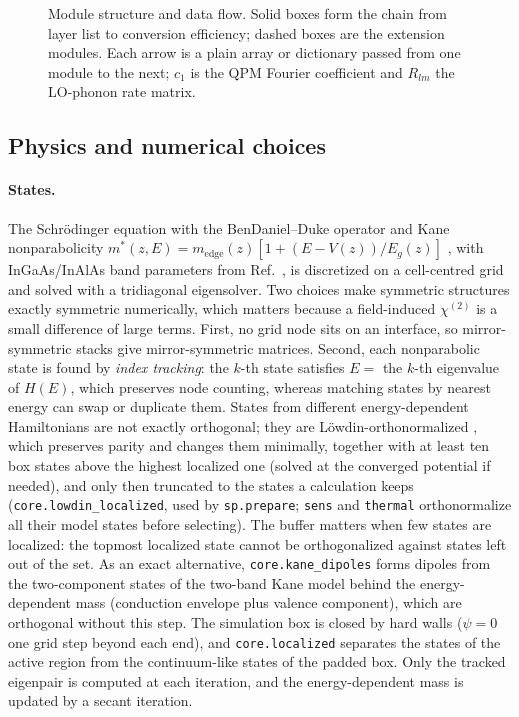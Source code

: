 \documentclass[11pt]{article}
\newcommand{\chitwo}{\chi^{(2)}}
\newcommand{\code}[1]{\texttt{#1}}
\begin{document}
\begin{figure}[t]
\caption{Module structure and data flow. Solid boxes form the chain from layer list to conversion efficiency; dashed boxes are the extension modules. Each arrow is a plain array or dictionary passed from one module to the next; $c_1$ is the QPM Fourier coefficient and $R_{lm}$ the LO-phonon rate matrix.}
\label{fig:arch}
\end{figure}

\subsection{Physics and numerical choices}
\paragraph{States.} The Schr\"odinger equation with the BenDaniel--Duke operator \cite{BenDaniel1966} and Kane nonparabolicity $m^*(z,E)=m_\mathrm{edge}(z)[1+(E-V(z))/E_g(z)]$ \cite{Nelson1987}, with InGaAs/InAlAs band parameters from Ref.~\cite{Vurgaftman2001}, is discretized on a cell-centred grid and solved with a tridiagonal eigensolver. Two choices make symmetric structures exactly symmetric numerically, which matters because a field-induced $\chitwo$ is a small difference of large terms. First, no grid node sits on an interface, so mirror-symmetric stacks give mirror-symmetric matrices. Second, each nonparabolic state is found by \emph{index tracking}: the $k$-th state satisfies $E=$ the $k$-th eigenvalue of $H(E)$, which preserves node counting, whereas matching states by nearest energy can swap or duplicate them. States from different energy-dependent Hamiltonians are not exactly orthogonal; they are L\"owdin-orthonormalized \cite{Lowdin1950}, which preserves parity and changes them minimally, together with at least ten box states above the highest localized one (solved at the converged potential if needed), and only then truncated to the states a calculation keeps (\code{core.lowdin\_localized}, used by \code{sp.prepare}; \code{sens} and \code{thermal} orthonormalize all their model states before selecting). The buffer matters when few states are localized: the topmost localized state cannot be orthogonalized against states left out of the set. As an exact alternative, \code{core.kane\_dipoles} forms dipoles from the two-component states of the two-band Kane model behind the energy-dependent mass (conduction envelope plus valence component), which are orthogonal without this step. The simulation box is closed by hard walls ($\psi=0$ one grid step beyond each end), and \code{core.localized} separates the states of the active region from the continuum-like states of the padded box. Only the tracked eigenpair is computed at each iteration, and the energy-dependent mass is updated by a secant iteration.
\end{document}
